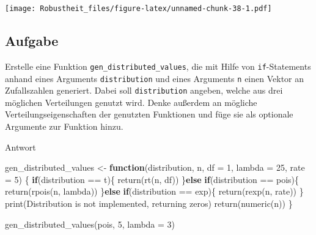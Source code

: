 \documentclass[
]{book}
\newenvironment{Shaded}{\begin{snugshade}}{\end{snugshade}}
\newcommand{\AttributeTok}[1]{\textcolor[rgb]{0.77,0.63,0.00}{#1}}
\newcommand{\ControlFlowTok}[1]{\textcolor[rgb]{0.13,0.29,0.53}{\textbf{#1}}}
\newcommand{\DecValTok}[1]{\textcolor[rgb]{0.00,0.00,0.81}{#1}}
\newcommand{\FunctionTok}[1]{\textcolor[rgb]{0.00,0.00,0.00}{#1}}
\newcommand{\NormalTok}[1]{#1}
\newcommand{\OtherTok}[1]{\textcolor[rgb]{0.56,0.35,0.01}{#1}}
\newcommand{\SpecialCharTok}[1]{\textcolor[rgb]{0.00,0.00,0.00}{#1}}
\newcommand{\StringTok}[1]{\textcolor[rgb]{0.31,0.60,0.02}{#1}}
\begin{document}
\texttt{[image: Robustheit\_files/figure-latex/unnamed-chunk-38-1.pdf]}

\hypertarget{aufgabe-3}{%
\subsection{Aufgabe}\label{aufgabe-3}}

Erstelle eine Funktion \texttt{gen\_distributed\_values}, die mit Hilfe von \texttt{if}-Statements anhand eines Arguments \texttt{distribution} und eines Arguments \texttt{n} einen Vektor an Zufallszahlen generiert. Dabei soll \texttt{distribution} angeben, welche aus drei möglichen Verteilungen genutzt wird. Denke außerdem an mögliche Verteilungseigenschaften der genutzten Funktionen und füge sie als optionale Argumente zur Funktion hinzu.

Antwort

\begin{Shaded}
\begin{Highlighting}[]
\NormalTok{gen\_distributed\_values }\OtherTok{\textless{}{-}} \ControlFlowTok{function}\NormalTok{(distribution,}
\NormalTok{                                   n,}
                                   \AttributeTok{df =} \DecValTok{1}\NormalTok{,}
                                   \AttributeTok{lambda =} \DecValTok{25}\NormalTok{,}
                                   \AttributeTok{rate =} \DecValTok{5}\NormalTok{) \{}
  \ControlFlowTok{if}\NormalTok{(distribution }\SpecialCharTok{==} \StringTok{\textquotesingle{}t\textquotesingle{}}\NormalTok{)\{}
    \FunctionTok{return}\NormalTok{(}\FunctionTok{rt}\NormalTok{(n, df))}
\NormalTok{  \}}\ControlFlowTok{else} \ControlFlowTok{if}\NormalTok{(distribution }\SpecialCharTok{==} \StringTok{\textquotesingle{}pois\textquotesingle{}}\NormalTok{)\{}
    \FunctionTok{return}\NormalTok{(}\FunctionTok{rpois}\NormalTok{(n, lambda))}
\NormalTok{  \}}\ControlFlowTok{else} \ControlFlowTok{if}\NormalTok{(distribution }\SpecialCharTok{==} \StringTok{\textquotesingle{}exp\textquotesingle{}}\NormalTok{)\{}
    \FunctionTok{return}\NormalTok{(}\FunctionTok{rexp}\NormalTok{(n, rate))}
\NormalTok{  \}}
  \FunctionTok{print}\NormalTok{(}\StringTok{\textquotesingle{}Distribution is not implemented, returning zeros\textquotesingle{}}\NormalTok{)}
  \FunctionTok{return}\NormalTok{(}\FunctionTok{numeric}\NormalTok{(n))}
\NormalTok{\}}

\FunctionTok{gen\_distributed\_values}\NormalTok{(}\StringTok{\textquotesingle{}pois\textquotesingle{}}\NormalTok{,}
                       \DecValTok{5}\NormalTok{,}
                       \AttributeTok{lambda =} \DecValTok{3}\NormalTok{)}
\end{Highlighting}
\end{Shaded}
\end{document}
